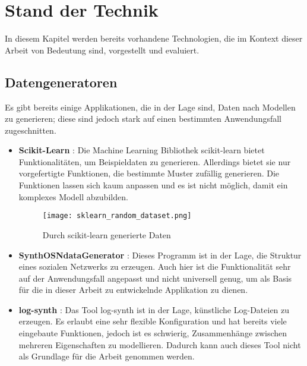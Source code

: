 
\chapter{Stand der Technik}

In diesem Kapitel werden bereits vorhandene Technologien, die im Kontext dieser Arbeit von Bedeutung sind, vorgestellt und evaluiert.

\section{Datengeneratoren}

Es gibt bereits einige Applikationen, die in der Lage sind, Daten nach Modellen zu generieren; diese sind jedoch stark auf einen bestimmten Anwendungsfall zugeschnitten.

\begin{itemize}
    \item \textbf{Scikit-Learn} \cite{scikit-learn:paper, scikit-learn:generator}: Die Machine Learning Bibliothek scikit-learn bietet Funktionalitäten, um Beispieldaten zu generieren. Allerdings bietet sie nur vorgefertigte Funktionen, die bestimmte Muster zufällig generieren. Die Funktionen lassen sich kaum anpassen und es ist nicht möglich, damit ein komplexes Modell abzubilden.
    \begin{figure}[H]
        \centering
        \texttt{[image: sklearn\_random\_dataset.png]}
        \caption{Durch scikit-learn generierte Daten \cite{scikit-learn:plots}}
        \label{fig:sklearndata}
    \end{figure}
    \item \textbf{SynthOSNdataGenerator} \cite{synthosndatagenerator}: Dieses Programm ist in der Lage, die Struktur eines sozialen Netzwerks zu erzeugen. Auch hier ist die Funktionalität sehr auf der Anwendungsfall angepasst und nicht universell genug, um als Basis für die in dieser Arbeit zu entwickelnde Applikation zu dienen.
    \item \textbf{log-synth} \cite{logsynth}: Das Tool log-synth ist in der Lage, künstliche Log-Dateien zu erzeugen. Es erlaubt eine sehr flexible Konfiguration und hat bereits viele eingebaute Funktionen, jedoch ist es schwierig, Zusammenhänge zwischen mehreren Eigenschaften zu modellieren. Dadurch kann auch dieses Tool nicht als Grundlage für die Arbeit genommen werden.
\end{itemize}

